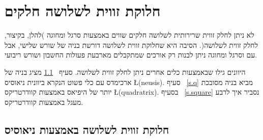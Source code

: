 

\chapter{חלוקת זווית לשלושה חלקים}
\label{c.trisect}


לא ניתן לחלק זווית שרירותית לשלושה חלקים שווים באמצעות סרגל ומחוגה )להלן, בקיצור, לחלק זווית לשלושה(.
הסיבה היא שחלוקת זווית לשלושה דורשת בניה של שורש שלישי, אבל עם  וסרגל ומחוגה ניתן לבנות רק אורכים שמתקבלים מארבעת פעולות החשבון ושורש ריבועי.

היוונים גילו שבאמצעות כלים אחרים ניתן לחלק זווית לשלושה. סעיף~%
\ref{s.neusis}
מציג בניה של ארכימדס עם כלי פשוט הנקרא ביוונית ניאוסיס
\L{(neusis)}.
סעיף~%
\ref{s.q}
מביא בניה מסובכת יותר של היפיאס באמצעות
קוודרטריקס
\L{(quadratrix)}.
בסעיף~%
\ref{s.square}
נסביר איך לרבע מעגל באמצעות קוודרטריקס.



\section{חלוקת זווית לשלושה באמצעות ניאוסיס}
\label{s.neusis}

